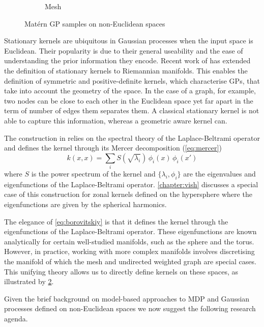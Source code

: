 \begin{figure}[tbh!]
\begin{subfigure}{0.3\textwidth}
  \caption{Mesh}
  \label{fig:mesh}
\end{subfigure}
\caption{Mat\'ern GP samples on non-Euclidean spaces}
\label{fig:gp-noneuclidean}
\end{figure}

Stationary kernels are ubiquitous in Gaussian processes when the input space is Euclidean. Their popularity is due to their general useability and the ease of understanding the prior information they encode. Recent work of \citet{Borovitskiy2020} has extended the definition of stationary kernels to Riemannian manifolds. This enables the definition of symmetric and positive-definite kernels, which characterise GPs, that take into account the geometry of the space. In the case of a graph, for example, two nodes can be close to each other in the Euclidean space yet far apart in the term of number of edges them separates them. A classical stationary kernel is not able to capture this information, whereas a geometric aware kernel can.

The construction in \citet{Borovitskiy2020} relies on the spectral theory of the Laplace-Beltrami operator and defines the kernel through its Mercer decomposition (\cref{eq:mercer})
\begin{equation}
    \label{eq:borovitskiy}
    k(x, x) = \sum_i S(\sqrt{\lambda_i})\,\phi_i(x)\,\phi_i(x')
\end{equation}
where $S$ is the power spectrum of the kernel and $\{\lambda_i, \phi_i\}$ are the eigenvalues and eigenfunctions of the Laplace-Beltrami operator. \cref{chapter:vish} discusses a special case of this construction for zonal kernels defined on the hypersphere where the eigenfunctions are given by the spherical harmonics.

The elegance of \cref{eq:borovitskiy} is that it defines the kernel through the eigenfunctions of the Laplace-Beltrami operator. These eigenfunctions are known analytically for certain well-studied manifolds, such as the sphere and the torus. However, in practice, working with more complex manifolds involves discretising the manifold of which the mesh and undirected weighted graph are special cases. This unifying theory allows us to directly define kernels on these spaces, as illustrated by \cref{fig:gp-noneuclidean}.

Given the brief background on model-based approaches to MDP and Gaussian processes defined on non-Euclidean spaces we now suggest the following research agenda. 

